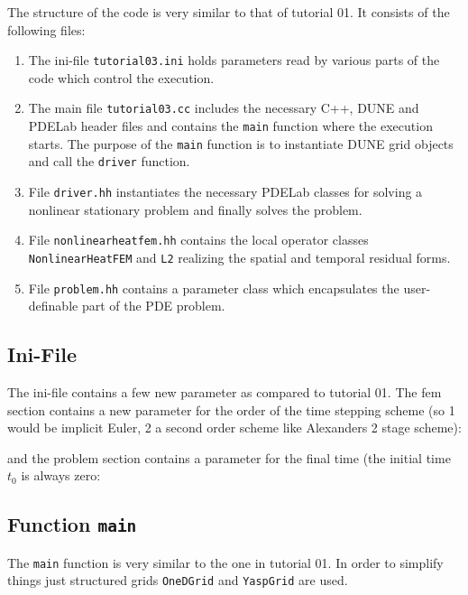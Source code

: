 \documentclass[a4paper,12pt]{article}
\begin{document}
The structure of the code is very similar to that of tutorial 01. 
It consists of the following files:
\begin{enumerate}[1)]
\item The ini-file
\lstinline{tutorial03.ini} holds parameters read by various parts of the code
which control the execution. 
\item The main file \lstinline{tutorial03.cc} includes the necessary C++,
DUNE and PDELab header files
and contains the \lstinline{main} function where the execution starts. 
The purpose of the \lstinline{main} function is
to instantiate DUNE grid objects and call the \lstinline{driver} function.
\item File \lstinline{driver.hh} instantiates the necessary PDELab classes 
for solving a nonlinear stationary problem and finally solves the problem.
\item File \lstinline{nonlinearheatfem.hh} contains the local operator classes
\lstinline{NonlinearHeatFEM} and \lstinline{L2} realizing the spatial
and temporal residual forms.
\item File \lstinline{problem.hh} contains a parameter class which
encapsulates the user-definable part of the PDE problem.
\end{enumerate}

\subsection{Ini-File}

The ini-file contains a few new parameter as compared to tutorial 01.
The fem section contains a new parameter for the order of the time stepping
scheme (so 1 would be implicit Euler, 2 a second order scheme like
Alexanders 2 stage scheme):

and the problem section contains a parameter for the final time (the
initial time $t_0$ is always zero:


\subsection{Function \lstinline{main}}

The \lstinline{main} function is very similar to the one in tutorial 01.
In order to simplify things just structured grids \lstinline{OneDGrid}
and \lstinline{YaspGrid} are used.
\end{document}
